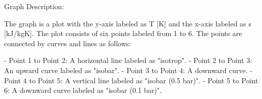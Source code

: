 Graph Description:

The graph is a plot with the y-axis labeled as T [K] and the x-axis labeled as s [kJ/kgK]. The plot consists of six points labeled from 1 to 6. The points are connected by curves and lines as follows:

- Point 1 to Point 2: A horizontal line labeled as "isotrop".
- Point 2 to Point 3: An upward curve labeled as "isobar".
- Point 3 to Point 4: A downward curve.
- Point 4 to Point 5: A vertical line labeled as "isobar (0.5 bar)".
- Point 5 to Point 6: A downward curve labeled as "isobar (0.1 bar)".
